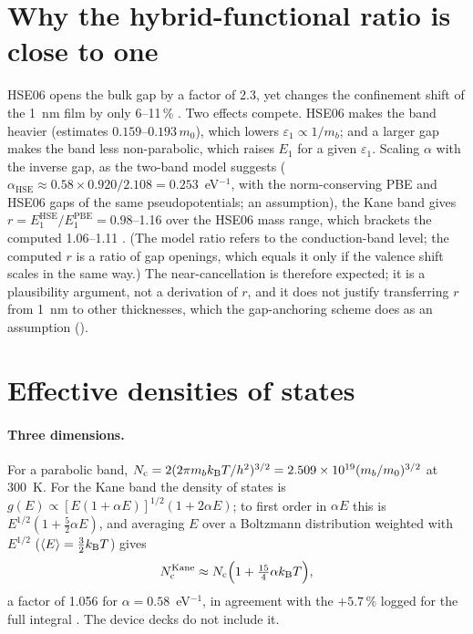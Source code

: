 \section{Why the hybrid-functional ratio is close to one}
\label{sec:mono-conf-hse}

HSE06 opens the bulk gap by a factor of 2.3, yet changes the confinement shift of the 1~nm film by only 6--11\,\%
. Two effects compete. HSE06 makes the band heavier (estimates $0.159$--$0.193\,m_0$), which lowers
$\varepsilon_1 \propto 1/m_b$; and a larger gap makes the band less non-parabolic, which raises $E_1$ for a given
$\varepsilon_1$. Scaling $\alpha$ with the inverse gap, as the two-band model suggests ($\alpha_{\mathrm{HSE}} \approx
0.58\times0.920/2.108 = 0.253$~eV$^{-1}$, with the norm-conserving PBE and HSE06 gaps of the same pseudopotentials; an
assumption), the Kane band gives $r = E_1^{\mathrm{HSE}}/E_1^{\mathrm{PBE}} = 0.98$--1.16 over the HSE06 mass range,
which brackets the computed 1.06--1.11 . (The model ratio refers to the conduction-band level; the computed
$r$ is a ratio of gap openings, which equals it only if the valence shift scales in the same way.) The near-cancellation is
therefore expected; it is a plausibility argument, not a derivation of $r$, and it does not justify transferring $r$
from 1~nm to other thicknesses, which the gap-anchoring scheme does as an assumption ().

\section{Effective densities of states}
\label{sec:mono-conf-dos}

\paragraph{Three dimensions.} For a parabolic band, $N_{\mathrm{c}} = 2(2\pi m_bk_{\mathrm{B}}T/h^2)^{3/2} = 2.509\times10^{19}(m_b/m_0)^{3/2}$\cmcu{}
at 300~K. For the Kane band the density of states is $g(E) \propto [E(1+\alpha E)]^{1/2}(1+2\alpha E)$; to first order in
$\alpha E$ this is $E^{1/2}(1+\tfrac52\alpha E)$, and averaging $E$ over a Boltzmann distribution weighted with $E^{1/2}$
($\langle E\rangle = \tfrac32k_{\mathrm{B}}T$) gives
\begin{equation}
N_{\mathrm{c}}^{\mathrm{Kane}} \approx N_{\mathrm{c}}\Big(1+\tfrac{15}{4}\alpha k_{\mathrm{B}}T\Big) ,
\label{eq:mono-conf-nc3d}
\end{equation}
a factor of 1.056 for $\alpha = 0.58$~eV$^{-1}$, in agreement with the $+5.7$\,\% logged for the full integral
. The device decks do not include it.

